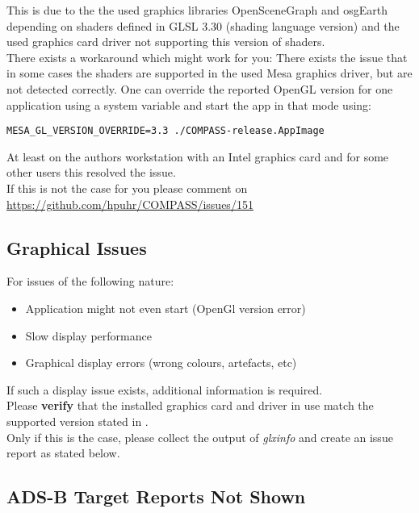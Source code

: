 This is due to the the used graphics libraries OpenSceneGraph and osgEarth depending on shaders defined in GLSL 3.30 (shading language version) and the used graphics card driver not supporting this version of shaders. \\

There exists a workaround which might work for you: There exists the issue that in some cases the shaders are supported in the used Mesa graphics driver, but are not detected correctly. One can override the reported OpenGL version for one application using a system variable and start the app in that mode using:

\begin{lstlisting}
MESA_GL_VERSION_OVERRIDE=3.3 ./COMPASS-release.AppImage
\end{lstlisting}

At least on the authors workstation with an Intel graphics card and for some other users this resolved the issue. \\

If this is not the case for you please comment on \url{https://github.com/hpuhr/COMPASS/issues/151}

\subsection{Graphical Issues}

For issues of the following nature:

\begin{itemize} 
\item Application might not even start (OpenGl version error)
\item Slow display performance
\item Graphical display errors (wrong colours, artefacts, etc) 
\end{itemize} 

If such a display issue exists, additional information is required. \\

Please \textbf{verify} that the installed graphics card and driver in use match the supported version stated in . \\

Only if this is the case, please collect the output of \textit{glxinfo} and create an issue report as stated below.

\subsection{ADS-B Target Reports Not Shown}

